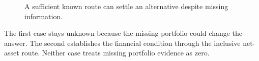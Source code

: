 \begin{figure}[H]
\centering
{}
\caption{A sufficient known route can settle an alternative despite missing information.}\label{fig:teach-P-03-product-03}
\end{figure}

The first case stays unknown because the missing portfolio could change the answer. The second establishes the financial condition through the inclusive net-asset route. Neither case treats missing portfolio evidence as zero.

